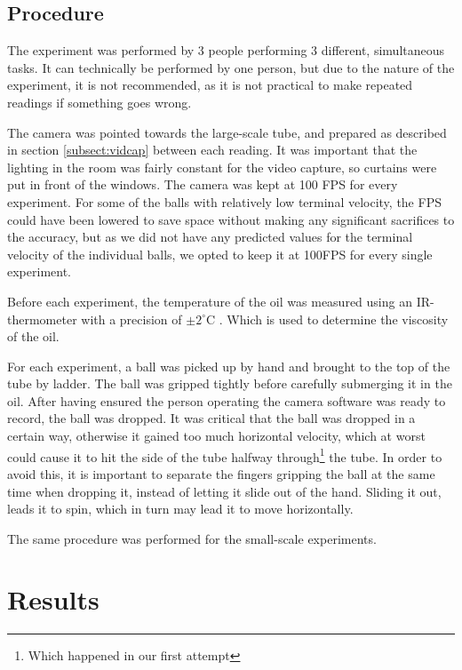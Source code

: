 \documentclass[11pt,a4paper]{article}
\begin{document}
  \subsection{Procedure}
    The experiment was performed by 3 people performing 3 different, simultaneous tasks. It can technically be performed by one person, but due to the nature of the experiment, it is not recommended, as it is not practical to make repeated readings if something goes wrong.

    The camera was pointed towards the large-scale tube, and prepared as described in section \ref{subsect:vidcap} between each reading. It was important that the lighting in the room was fairly constant for the video capture, so curtains were put in front of the windows. The camera was kept at 100 FPS for every experiment. For some of the balls with relatively low terminal velocity, the FPS could have been lowered to save space without making any significant sacrifices to the accuracy, but as we did not have any predicted values for the terminal velocity of the individual balls, we opted to keep it at 100FPS for every single experiment.

    Before each experiment, the temperature of the oil was measured using an IR-thermometer with a precision of $\pm2^\circ$C \cite{_fluke_????}. Which is used to determine the viscosity of the oil.

    For each experiment, a ball was picked up by hand and brought to the top of the tube by ladder. The ball was gripped tightly before carefully submerging it in the oil. After having ensured the person operating the camera software was ready to record, the ball was dropped. It was critical that the ball was dropped in a certain way, otherwise it gained too much horizontal velocity, which at worst could cause it to hit the side of the tube halfway through\footnote{Which happened in our first attempt} the tube. In order to avoid this, it is important to separate the fingers gripping the ball at the same time when dropping it, instead of letting it slide out of the hand. Sliding it out, leads it to spin, which in turn may lead it to move horizontally.

    The same procedure was performed for the small-scale experiments.
    



\section{\label{sect:results}Results}
\end{document}
